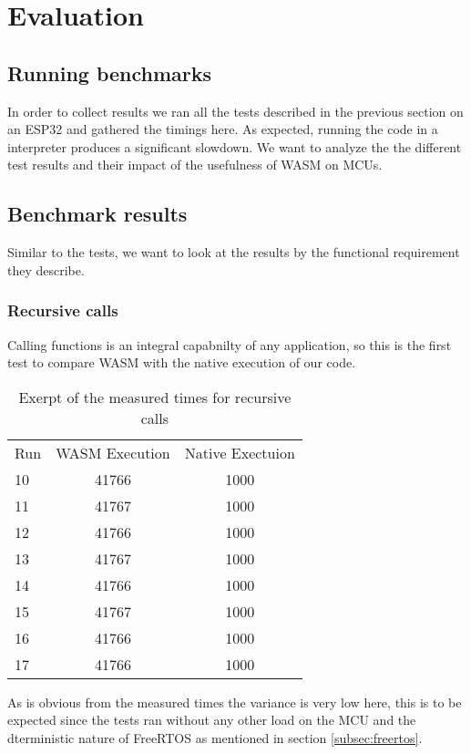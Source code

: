 
\chapter{Evaluation}\label{chapter:evaluation}
\section{Running benchmarks}
In order to collect results we ran all the tests described in the previous section on an ESP32 and gathered the timings here. As expected, running the code in a interpreter produces a significant slowdown. We want to analyze the the different test results and their impact of the usefulness of WASM on MCUs.
\section{Benchmark results}
Similar to the tests, we want to look at the results by the functional requirement they describe.
\subsection{Recursive calls}
Calling functions is an integral capabnilty of any application, so this is the first test to compare WASM with the native execution of our code.

\begin{table}
    \begin{tabular}{l c c}
        Run & WASM Execution & Native Exectuion \\
        10  & 41766          & 1000             \\
        11  & 41767          & 1000             \\
        12  & 41766          & 1000             \\
        13  & 41767          & 1000             \\
        14  & 41766          & 1000             \\
        15  & 41767          & 1000             \\
        16  & 41766          & 1000             \\
        17  & 41766          & 1000             \\
    \end{tabular}
    \caption{Exerpt of the measured times for recursive calls}
    \label{tab:times_recursive}
\end{table}
As is obvious from the measured times the variance is very low here, this is to be expected since the tests ran without any other load on the MCU and the dterministic nature of FreeRTOS as mentioned in section \ref{subsec:freertos}.

